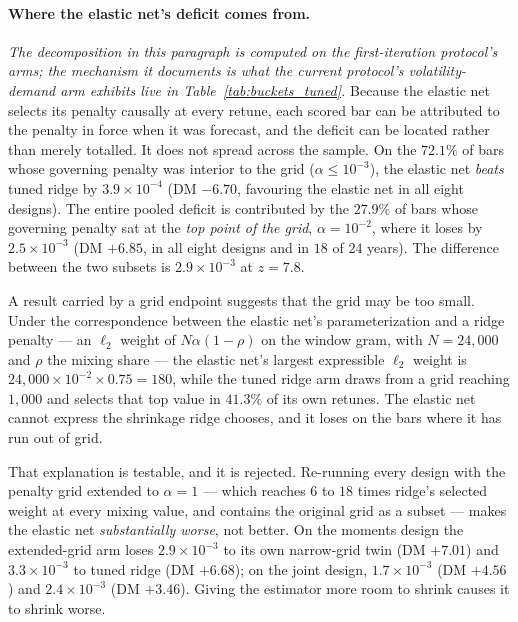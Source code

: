 \paragraph{Where the elastic net's deficit comes from.}
\emph{The decomposition in this paragraph is computed on the
first-iteration protocol's arms; the mechanism it documents is what the
current protocol's volatility-demand arm exhibits live in
Table~\ref{tab:buckets_tuned}.}
Because the elastic net selects its penalty causally at every retune,
each scored bar can be attributed to the penalty in force when it was
forecast, and the deficit can be located rather than merely totalled.
It does not spread across the sample. On the $72.1\%$ of bars whose
governing penalty was interior to the grid ($\alpha \le 10^{-3}$), the
elastic net \emph{beats} tuned ridge by
$3.9 \times 10^{-4}$ (DM $-6.70$, favouring the elastic net in all eight
designs). The entire pooled deficit is contributed by the $27.9\%$ of
bars whose governing penalty sat at the \emph{top point of the grid},
$\alpha = 10^{-2}$, where it loses by $2.5 \times 10^{-3}$ (DM $+6.85$,
in all eight designs and in $18$ of $24$ years). The
difference between the two subsets is $2.9 \times 10^{-3}$ at
$z = 7.8$.

A result carried by a grid endpoint suggests that the grid may be
too small. Under the correspondence between the elastic net's
parameterization and a ridge penalty --- an $\ell_2$ weight of $N \alpha
(1 - \rho)$ on the window gram, with $N = 24{,}000$ and $\rho$ the
mixing share --- the elastic net's largest expressible $\ell_2$ weight
is $24{,}000 \times 10^{-2} \times 0.75 = 180$, while the tuned ridge
arm draws from a grid reaching $1{,}000$ and selects that top value in
$41.3\%$ of its own retunes. The elastic net cannot express the
shrinkage ridge chooses, and it loses on the bars where it has run out
of grid.

That explanation is testable, and it is rejected. Re-running every design
with the penalty grid extended to $\alpha = 1$ --- which reaches $6$ to
$18$ times ridge's selected weight at every mixing value, and contains
the original grid as a subset --- makes the elastic net
\emph{substantially worse}, not better. On the moments design the
extended-grid arm loses $2.9 \times 10^{-3}$ to its own narrow-grid twin
(DM $+7.01$) and $3.3 \times 10^{-3}$ to tuned ridge (DM $+6.68$); on
the joint design, $1.7 \times 10^{-3}$ (DM $+4.56$) and $2.4 \times
10^{-3}$ (DM $+3.46$). Giving the estimator more room to shrink causes
it to shrink worse.

